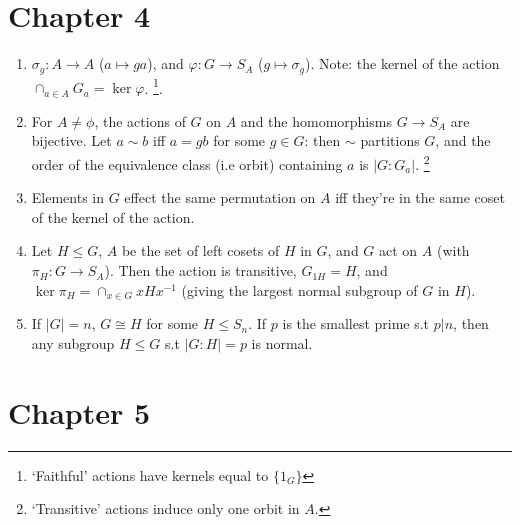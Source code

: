 \documentclass{article}
\begin{document}
\section*{Chapter 4}

\begin{enumerate}[1.]
    \item $\sigma_g : A \rightarrow A$ ($a \mapsto ga$), and
        $\varphi : G \rightarrow S_A$ ($g \mapsto \sigma_g$). 
        Note: the kernel of the action $\cap_{a \in A} G_a = \ker \varphi$.
        \footnote{`Faithful' actions have kernels equal to $\{1_G\}$}.
    \item For $A \not= \phi$, the actions of $G$ on $A$ and the
        homomorphisms $G \rightarrow S_A$ are bijective. Let $a \sim b$ iff $a
        = gb$ for some $g \in G$: then $\sim$ partitions $G$, and the order
        of the equivalence class (i.e orbit) containing $a$ is $|G : G_a|$.
        \footnote{`Transitive' actions induce only one orbit in $A$.}
    \item Elements in $G$ effect the same permutation on $A$ iff they're in
        the same coset of the kernel of the action.
    \item Let $H \leq G$, $A$ be the set of left cosets of $H$ in $G$, and
        $G$ act on $A$ (with $\pi_H : G \rightarrow S_A$). Then the action
        is transitive, $G_{1H} = H$, and $\ker \pi_H = \cap_{x \in G}
        xHx^{-1}$ (giving the largest normal subgroup of $G$ in $H$).
    \item If $|G| = n$, $G \cong H$ for some $H \leq S_n$. If $p$ is the
        smallest prime s.t $p | n$, then any subgroup $H \leq G$ s.t $|G :
        H| = p$ is normal.
\end{enumerate}

\section*{Chapter 5}
\end{document}
